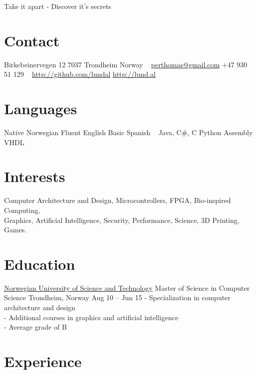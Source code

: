 \documentclass[print]{friggeri-cv}
\begin{document}
       {Take it apart - Discover it's secrets}

\begin{aside}
    \section{Contact}
        Birkebeinervegen 12
        7037 Trondheim
        Norway
        ~
        \href{mailto:perthomas@gmail.com}{perthomas@gmail.com}
        +47 930 51 129
        ~
        \href{http://github.com/lundal}{http://github.com/lundal}
        \href{http://lund.al}{http://lund.al}
    \section{Languages}
        Native Norwegian
        Fluent English
        Basic Spanish
        ~
        Java, C\#, C
        Python
        Assembly
        VHDL
\end{aside}

\section{Interests}

Computer Architecture and Design,
Microcontrollers,
FPGA,
Bio-inspired Computing,
\\
Graphics,
Artificial Intelligence,
Security,
Performance,
Science,
3D Printing,
Games.

\vspace{2mm}
\section{Education}

\begin{entrylist}
    \entryx
        {\href{http://ntnu.no/}{Norwegian University of Science and Technology}}
        {Master of Science in Computer Science}
        {Trondheim, Norway}
        {Aug 10 – Jun 15}
        {- Specialization in computer architecture and design\\
         - Additional courses in graphics and artificial intelligence\\
         - Average grade of B}
\end{entrylist}

\section{Experience}
\end{document}
